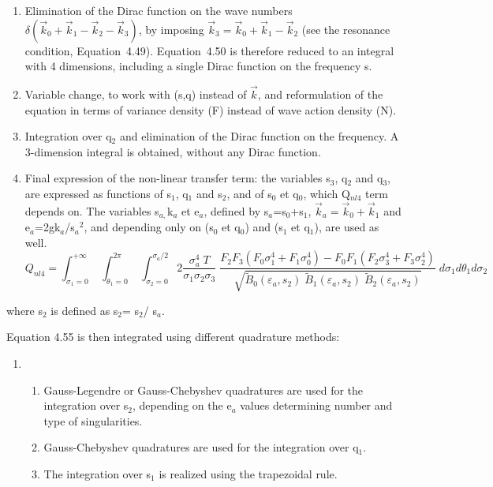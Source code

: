 \begin{enumerate}
\item  Elimination of the Dirac function on the wave numbers $\delta \left(\vec{k}_{0} +\vec{k}_{1} -\vec{k}_{2} -\vec{k}_{3} \right)$, by imposing $\vec{k}_{3} =\vec{k}_{0} +\vec{k}_{1} -\vec{k}_{2} $ (see the resonance condition, Equation~4.49). Equation~4.50 is therefore reduced to an integral with 4 dimensions, including a single Dirac function on the frequency s.

\item  Variable change, to work with (s,q) instead of $\vec{k}$, and reformulation of the equation in terms of variance density (F) instead of wave action density (N).

\item  Integration over q${}_{2}$ and elimination of the Dirac function on the frequency. A 3-dimension integral is obtained, without any Dirac function.

\item  Final expression of the non-linear transfer term: the variables s${}_{3}$, q${}_{2}$ and q${}_{3}$, are expressed as functions of s${}_{1}$, q${}_{1}$ and s${}_{2}$, and of s${}_{0}$ et q${}_{0}$, which Q${}_{nl4}$ term depends on. The variables s${}_{a, }$k${}_{a}$ et e${}_{a}$, defined by s${}_{a}$=s${}_{0}$+s${}_{1}$, $\vec{k}_{a} =\vec{k}_{0} +\vec{k}_{1} $ and e${}_{a}$=2gk${}_{a}$/s${}_{a}$${}^{2}$, and depending only on (s${}_{0}$ et q${}_{0}$) and (s${}_{1}$ et q${}_{1}$), are used as well.
\begin{equation} \label{GrindEQ__4_62_}
Q_{nl4} =\int _{\sigma _{1} =0}^{+\infty }\; \int _{\theta _{1} =0}^{2\pi }\; \int _{\sigma _{2} =0}^{\sigma _{a} /2}   2\frac{\sigma _{a}^{4} \; T}{\sigma _{1} \sigma _{2} \sigma _{3} } \; \frac{F_{2} F_{3} (F_{0} \sigma _{1}^{4} +F_{1} \sigma _{0}^{4} )-F_{0} F_{1} (F_{2} \sigma _{3}^{4} +F_{3} \sigma _{2}^{4} )}{\sqrt{\tilde{B}_{0} \left(\varepsilon _{a} ,s_{2} \right)\; \tilde{B}_{1} \left(\varepsilon _{a} ,s_{2} \right)\; \tilde{B}_{2} \left(\varepsilon _{a} ,s_{2} \right)} } \; d\sigma _{1} d\theta _{1} d\sigma _{2}
\end{equation}
\end{enumerate}
where s${}_{2}$ is defined as s${}_{2}$= s${}_{2}$/ s${}_{a}$.

 Equation 4.55 is then integrated using different quadrature methods:

\begin{enumerate}
\item \begin{enumerate}
\item  Gauss-Legendre or Gauss-Chebyshev quadratures are used for the integration over s${}_{2}$, depending on the e${}_{a}$ values determining number and type of singularities.

\item  Gauss-Chebyshev quadratures are used for the integration over q${}_{1}$.

\item  The integration over s${}_{1}$ is realized using the trapezoidal rule.
\end{enumerate}
\end{enumerate}

